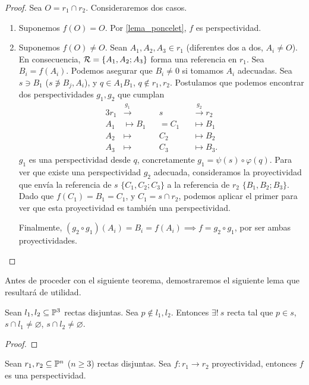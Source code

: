 \begin{proof} %
    Sea $O = r_1 \cap r_2$. Consideraremos dos casos.
    \begin{enumerate}
        \item Suponemos $f(O) = O$. Por \ref{lema_poncelet}, 
        $f$ es perspectividad.
        \item Suponemos $f(O) \neq O$. Sean $A_1, A_2, A_3 \in r_1$
        (diferentes dos a dos, $A_i \neq O$). En consecuencia,
        $\mathcal{R} = \{A_1, A_2; A_3\}$ forma una referencia en $r_1$.
        Sea $B_i = f(A_i)$. Podemos asegurar que $B_i \neq 0$
        si tomamos $A_i$ adecuadas. Sea $s \ni B_1$ ($ s 
        \not \ni B_j, A_i$), y $q \in A_1B_1$, $q \not
        \in r_1, r_2$. Postulamos que podemos encontrar
        dos perspectividades $g_1, g_2$ que cumplan
        \begin{alignat*}{3}
            r_1 &\stackrel{g_1}\longrightarrow &&s&&
            \stackrel{g_2}\longrightarrow r_2\\
            A_1 &\longmapsto B_1&&=C_1 &&\longmapsto B_1\\
            A_2 &\longmapsto &&C_2&&\longmapsto B_2\\
            A_3 &\longmapsto &&C_3&&\longmapsto B_3.
        \end{alignat*}
        $g_1$ es una perspectividad desde $q$, concretamente
        $g_1 = \psi(s) \circ \varphi(q)$. Para ver que existe
        una perspectividad $g_2$ adecuada, consideramos la
        proyectividad que envía la referencia de $s$
        $\{C_1, C_2; C_3\}$ a la referencia de $r_2$ $\{B_1,
        B_2; B_3\}$. Dado que $f(C_1) = B_1 = C_1$, y $C_1 = 
        s \cap r_2$, podemos aplicar el primer para ver que 
        esta proyectividad es también una perspectividad.
        
        Finalmente, $(g_2 \circ g_1)(A_i) = B_i = f(A_i) \implies
        f = g_2 \circ g_1$, por ser ambas proyectividades.
        
    \end{enumerate}
\end{proof}

Antes de proceder con el siguiente teorema, demostraremos
el siguiente lema que resultará de utilidad.

\begin{lema} %
    \label{lema_rectas_poncelet}
    Sean $l_1, l_2 \subseteq \mathbb{P}^3$ rectas disjuntas. Sea $p \not \in 
    l_1, l_2$. Entonces $\exists! \: s$ recta 
    tal que $p \in s$, $s \cap l_1 \neq \varnothing$, 
    $s \cap l_2 \neq \varnothing$.
\end{lema}
\begin{proof}
    
\end{proof}
\begin{teo} %
    Sean $r_1, r_2 \subseteq \mathbb{P}^n$ ($n \geq 3$) rectas disjuntas.
    Sea $f \colon r_1 \to r_2$ proyectividad, entonces $f$
    es una perspectividad. 
\end{teo}

